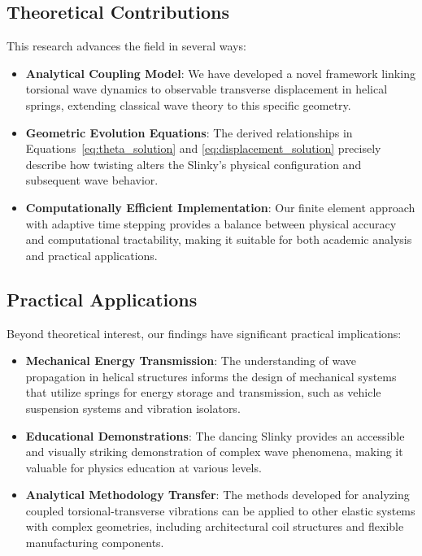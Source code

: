 \documentclass{mcmthesis}  %
\begin{document}
\subsection{Theoretical Contributions}
This research advances the field in several ways:

\begin{itemize}
    \item \textbf{Analytical Coupling Model}: We have developed a novel framework linking torsional wave dynamics to observable transverse displacement in helical springs, extending classical wave theory to this specific geometry.
    
    \item \textbf{Geometric Evolution Equations}: The derived relationships in Equations~\ref{eq:theta_solution} and \ref{eq:displacement_solution} precisely describe how twisting alters the Slinky's physical configuration and subsequent wave behavior.
    
    \item \textbf{Computationally Efficient Implementation}: Our finite element approach with adaptive time stepping provides a balance between physical accuracy and computational tractability, making it suitable for both academic analysis and practical applications.
\end{itemize}

\subsection{Practical Applications}
Beyond theoretical interest, our findings have significant practical implications:

\begin{itemize}
    \item \textbf{Mechanical Energy Transmission}: The understanding of wave propagation in helical structures informs the design of mechanical systems that utilize springs for energy storage and transmission, such as vehicle suspension systems and vibration isolators.
    
    \item \textbf{Educational Demonstrations}: The dancing Slinky provides an accessible and visually striking demonstration of complex wave phenomena, making it valuable for physics education at various levels.
    
    \item \textbf{Analytical Methodology Transfer}: The methods developed for analyzing coupled torsional-transverse vibrations can be applied to other elastic systems with complex geometries, including architectural coil structures and flexible manufacturing components.
\end{itemize}
\end{document}
